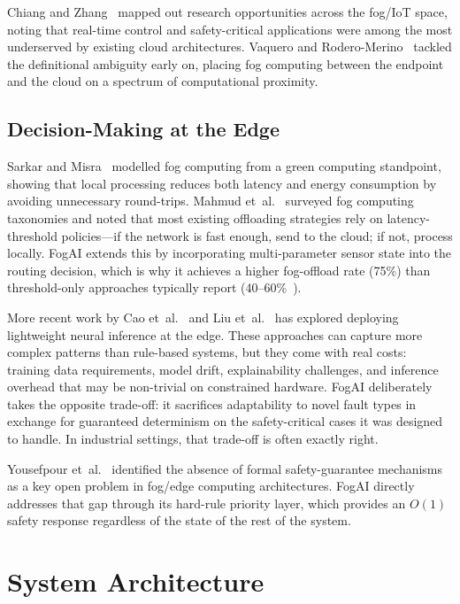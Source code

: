 \documentclass[conference]{IEEEtran}
\begin{document}
Chiang and Zhang~\cite{chiang2016fog} mapped out research opportunities
across the fog/IoT space, noting that real-time control and
safety-critical applications were among the most underserved by
existing cloud architectures.
Vaquero and Rodero-Merino~\cite{vaquero2014fog} tackled the
definitional ambiguity early on, placing fog computing between the
endpoint and the cloud on a spectrum of computational proximity.

\subsection{Decision-Making at the Edge}

Sarkar and Misra~\cite{sarkar2016fog} modelled fog computing from a
green computing standpoint, showing that local processing reduces both
latency and energy consumption by avoiding unnecessary round-trips.
Mahmud et~al.~\cite{mahmud2018fog} surveyed fog computing taxonomies
and noted that most existing offloading strategies rely on
latency-threshold policies---if the network is fast enough, send to
the cloud; if not, process locally.
FogAI extends this by incorporating multi-parameter sensor state into
the routing decision, which is why it achieves a higher fog-offload
rate (75\%) than threshold-only approaches typically report
(40--60\%~\cite{mahmud2018fog}).

More recent work by Cao et~al.~\cite{cao2020edge} and Liu
et~al.~\cite{liu2019edge} has explored deploying lightweight neural
inference at the edge.
These approaches can capture more complex patterns than rule-based
systems, but they come with real costs: training data requirements,
model drift, explainability challenges, and inference overhead that
may be non-trivial on constrained hardware.
FogAI deliberately takes the opposite trade-off: it sacrifices
adaptability to novel fault types in exchange for guaranteed
determinism on the safety-critical cases it was designed to handle.
In industrial settings, that trade-off is often exactly right.

Yousefpour et~al.~\cite{yousefpour2019fog} identified the absence of
formal safety-guarantee mechanisms as a key open problem in fog/edge
computing architectures.
FogAI directly addresses that gap through its hard-rule priority layer,
which provides an $O(1)$ safety response regardless of the state of
the rest of the system.


\section{System Architecture}
\label{sec:arch}
\end{document}
